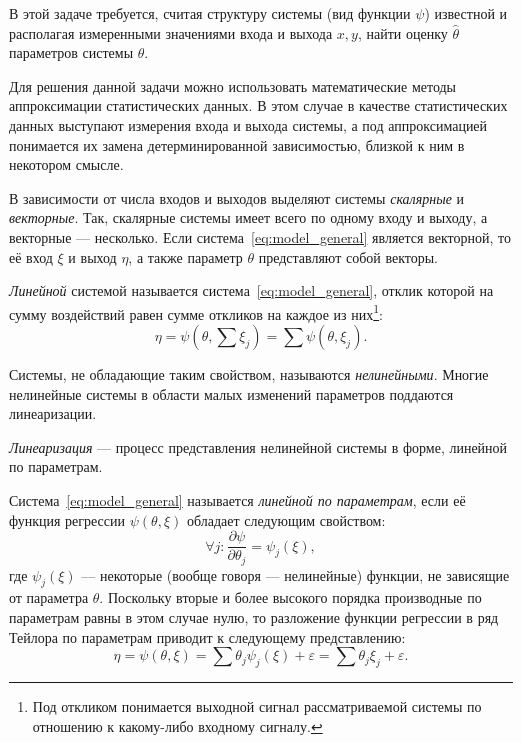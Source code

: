 В этой задаче требуется,
считая структуру системы (вид функции \( \psi \)) известной и располагая
измеренными значениями входа и выхода \( x, y \),
найти оценку \( \hat{\theta} \) параметров системы \( \theta \).

Для решения данной задачи можно использовать математические методы аппроксимации статистических данных.
В этом случае в качестве статистических данных выступают измерения входа и выхода системы,
а под аппроксимацией понимается их замена детерминированной зависимостью,
близкой к ним в некотором смысле. %

В зависимости от числа входов и выходов выделяют системы \emph{скалярные} и \emph{векторные}.
Так, скалярные системы имеет всего по одному входу и выходу, а векторные --- несколько.
Если система~\eqref{eq:model_general} является векторной, то её вход \( \xi \) и выход \( \eta \),
а также параметр \( \theta \) представляют собой векторы.

\emph{Линейной} системой называется система~\eqref{eq:model_general},
отклик которой на сумму воздействий равен сумме откликов на каждое из них\footnote{%
  Под откликом понимается выходной сигнал рассматриваемой системы по отношению к
  какому-либо входному сигналу.}:
\begin{equation*}
  \eta = \psi(\theta, \sum \xi_j) = \sum \psi(\theta, \xi_j).
\end{equation*}

Системы, не обладающие таким свойством, называются \emph{нелинейными}.
Многие нелинейные системы в области малых изменений параметров поддаются линеаризации.

\emph{Линеаризация} --- процесс представления нелинейной системы в форме, линейной по параметрам.

Система~\eqref{eq:model_general} называется \emph{линейной по параметрам},
если её функция регрессии \( \psi(\theta, \xi) \) обладает следующим свойством:
\begin{equation*}
  \forall j: \dfrac{\partial \psi}{\partial \theta_j} = \psi_j(\xi),
\end{equation*}
где \( \psi_j(\xi) \) --- некоторые (вообще говоря --- нелинейные) функции,
не зависящие от параметра \( \theta \).
Поскольку вторые и более высокого порядка производные по параметрам равны в этом случае нулю,
то разложение функции регрессии в ряд Тейлора по параметрам приводит к следующему представлению:
\begin{equation}
  \eta =
  \psi(\theta, \xi) =
  \sum \theta_j \psi_j(\xi) + \varepsilon =
  \sum \theta_j \xi_j + \varepsilon.
  \label{eq:linearization}
\end{equation}

